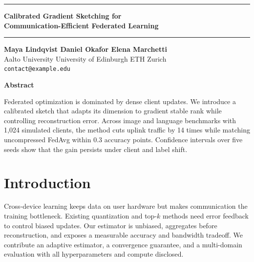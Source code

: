 \documentclass[10pt]{article}
\newif\ifanonymous
\begin{document}
\ifanonymous\linenumbers\fi

\noindent\rule{\textwidth}{4pt}
\begin{center}
  \vspace{4pt}
  {\bfseries\fontsize{17}{20}\selectfont Calibrated Gradient Sketching for\\
  Communication-Efficient Federated Learning\par}
  \vspace{6pt}
\end{center}
\noindent\rule{\textwidth}{1pt}

\vspace{12pt}
\begin{center}
\ifanonymous
  {\bfseries Anonymous authors}\\
  {\small NeurIPS 2026 style submission}
\else
  {\bfseries Maya Lindqvist \quad Daniel Okafor \quad Elena Marchetti}\\
  {\small Aalto University \quad University of Edinburgh \quad ETH Zurich}\\
  {\small\texttt{contact@example.edu}}
\fi
\end{center}

\vspace{10pt}
\begin{center}{\bfseries\large Abstract}\end{center}
\begin{list}{}{\leftmargin=0.5in\rightmargin=0.5in}\item\relax
Federated optimization is dominated by dense client updates. We introduce a
calibrated sketch that adapts its dimension to gradient stable rank while
controlling reconstruction error. Across image and language benchmarks with
1{,}024 simulated clients, the method cuts uplink traffic by 14 times while
matching uncompressed FedAvg within 0.3 accuracy points. Confidence intervals
over five seeds show that the gain persists under client and label shift.
\end{list}

\section{Introduction}
Cross-device learning keeps data on user hardware but makes communication the
training bottleneck. Existing quantization and top-$k$ methods need error
feedback to control biased updates. Our estimator is unbiased, aggregates
before reconstruction, and exposes a measurable accuracy and bandwidth
tradeoff. We contribute an adaptive estimator, a convergence guarantee, and a
multi-domain evaluation with all hyperparameters and compute disclosed.
\end{document}
